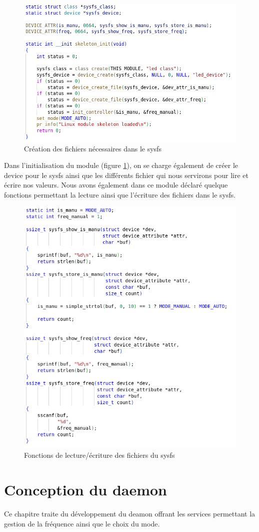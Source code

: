 \documentclass{ReportTemplate}
\begin{document}
\begin{figure}[H]
    \includegraphics[width= \textwidth]{imageSources/Skeleton_Init.png}
    \caption{Création des fichiers nécessaires dans le sysfs}
    \label{fig:sysfsInit}
\end{figure}
Dans l'initialisation du module (figure \ref{fig:sysfsInit}), on se charge également de créer le device pour
le sysfs ainsi que les différents fichier qui nous servirons pour lire et écrire
nos valeurs.\newpage
Nous avons également dans ce module déclaré quelque fonctions permettant la
lecture ainsi que l'écriture des fichiers dans le sysfs.
\begin{figure}[H]
    \includegraphics[width= \textwidth]{imageSources/Utility_Fct_Module.png}
    \caption{Fonctions de lecture/écriture des fichiers du sysfs}
    \label{fig:sysfsFunctions}
\end{figure}

\chapter{Conception du daemon}
Ce chapitre traite du développement du deamon offrant les services permettant la
gestion de la fréquence ainsi que le choix du mode.
\end{document}
